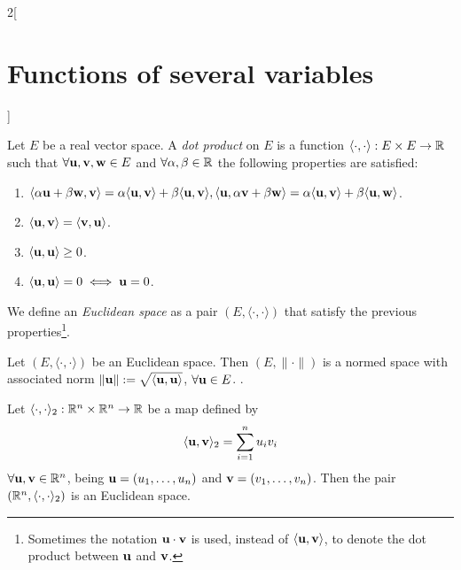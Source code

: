 \documentclass[../../../main.tex]{subfiles}
\begin{document}
\begin{multicols}{2}[\section{Functions of several variables}]
\begin{prop}
    \end{prop}
    \begin{definition}
        Let $E$ be a real vector space. A \textit{dot product} on $E$ is a function $\langle\cdot,\cdot\rangle:E\times E\rightarrow\mathbb{R} $ such that $\forall \vb{u},\vb{v},\vb{w}\in E$ and $\forall\alpha,\beta\in\mathbb{R} $ the following properties are satisfied:
        \begin{enumerate}
            \item $\langle \alpha \vb{u}+\beta \vb{w},\vb{v}\rangle=\alpha\langle \vb{u},\vb{v}\rangle+\beta\langle \vb{u},\vb{v}\rangle,\\\langle \vb{u},\alpha \vb{v}+\beta \vb{w}\rangle=\alpha\langle \vb{u},\vb{v}\rangle+\beta\langle \vb{u},\vb{w}\rangle$.
            \item $\langle \vb{u},\vb{v}\rangle=\langle \vb{v},\vb{u}\rangle$.
            \item $\langle \vb{u},\vb{u}\rangle\geq 0$.
            \item $\langle \vb{u},\vb{u}\rangle=0\iff \vb{u}=0$.
        \end{enumerate}
        We define an \textit{Euclidean space} as a pair $(E,\langle\cdot,\cdot\rangle)$ that satisfy the previous properties\footnote{Sometimes the notation $\vb{u}\cdot \vb{v}$ is used, instead of $\langle \vb{u},\vb{v}\rangle$, to denote the dot product between $\vb{u}$ and $\vb{v}$.}.
    \end{definition}
    \begin{prop}
        Let $(E,\langle\cdot,\cdot\rangle)$ be an Euclidean space. Then $(E,\|\cdot\|)$ is a normed space with associated norm $\|\vb{u}\|:=\sqrt{\langle \vb{u},\vb{u}\rangle}$, $\forall \vb{u}\in E$. .
    \end{prop}
    \begin{prop}
        Let $\langle\cdot,\cdot\rangle_2:\mathbb{R}^n\times\mathbb{R}^n\rightarrow\mathbb{R} $ be a map defined by $$\langle \vb{u},\vb{v}\rangle_2=\sum_{i=1}^nu_iv_i$$ $\forall \vb{u},\vb{v}\in \mathbb{R}^n$, being $\vb{u}=(u_1,\ldots,u_n)$ and $\vb{v}=(v_1,\ldots,v_n)$. Then the pair $(\mathbb{R}^n,\langle\cdot,\cdot\rangle_2)$ is an Euclidean space.
    \end{prop}
    \begin{corollary}

\end{corollary}
\end{multicols}
\end{document}
